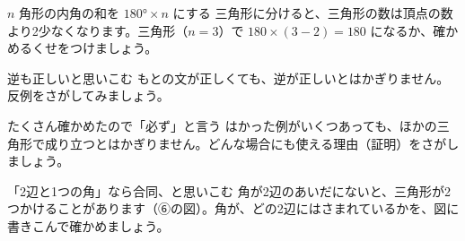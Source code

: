 \begin{tsumazuki}{$n$ 角形の内角の和を $180°\times n$ にする}
三角形に分けると、三角形の数は頂点の数より2少なくなります。三角形（$n=3$）で $180\times(3-2)=180$ になるか、確かめるくせをつけましょう。
\end{tsumazuki}

\begin{tsumazuki}{逆も正しいと思いこむ}
もとの文が正しくても、逆が正しいとはかぎりません。反例をさがしてみましょう。
\end{tsumazuki}

\begin{tsumazuki}{たくさん確かめたので「必ず」と言う}
はかった例がいくつあっても、ほかの三角形で成り立つとはかぎりません。どんな場合にも使える理由（証明）をさがしましょう。
\end{tsumazuki}

\begin{tsumazuki}{「2辺と1つの角」なら合同、と思いこむ}
角が2辺のあいだにないと、三角形が2つかけることがあります（⑥の図）。角が、どの2辺にはさまれているかを、図に書きこんで確かめましょう。
\end{tsumazuki}

